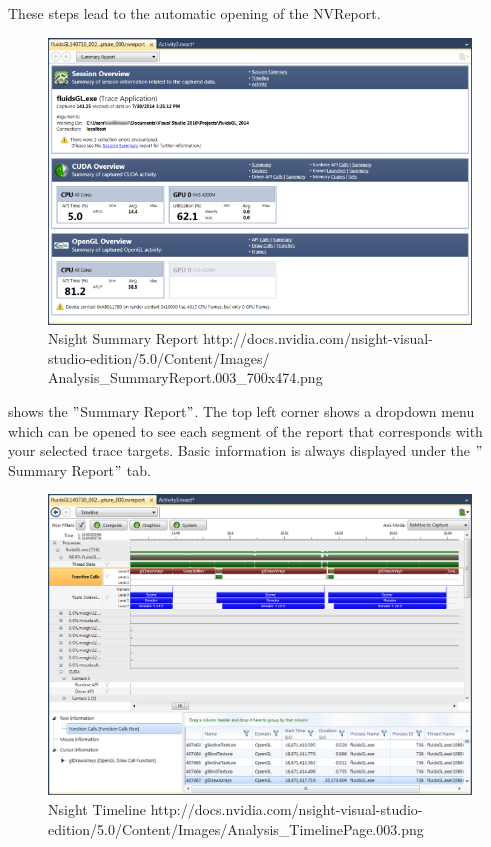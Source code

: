These steps lead to the automatic opening of the NVReport.

\begin{figure}[htbp]
\includegraphics[scale = 0.4]{img/NSight_NVReport1.png}
\caption{Nsight Summary Report
http://docs.nvidia.com/nsight-visual-studio-edition/5.0/Content/Images/
Analysis\_SummaryReport.003\_700x474.png}
\label{fig:Nsight_NVReport1}
\end{figure}

 shows the $"$Summary Report$"$. The top left corner shows a dropdown menu which can be opened to see each segment of the report that corresponds with your selected trace targets. Basic information is always displayed under the $"$Summary Report$"$ tab.

\begin{figure}[htbp]
\includegraphics[scale = 0.3]{img/NSight_NVReport2.png}
\caption{Nsight Timeline
http://docs.nvidia.com/nsight-visual-studio-edition/5.0/Content/Images/Analysis\_TimelinePage.003.png}
\label{fig:Nsight_NVReport2}
\end{figure}

